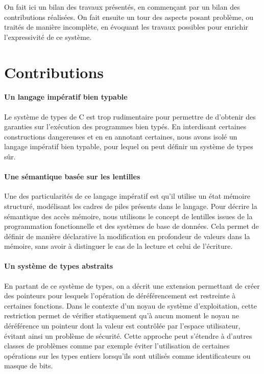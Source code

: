 On fait ici un bilan des travaux présentés, en commençant par un bilan des
contributions réalisées. On fait ensuite un tour des aspects posant problème, ou
traités de manière incomplète, en évoquant les travaux possibles pour enrichir
l'expressivité de ce système.


\section{Contributions}

\paragraph{Un langage impératif bien typable}

Le système de types de C est trop rudimentaire pour permettre de d'obtenir des
garanties sur l'exécution des programmes bien typés. En interdisant certaines
constructions dangereuses et en en annotant certaines, nous avons isolé un
langage impératif bien typable, pour lequel on peut définir un système de types
sûr.

\paragraph{Une sémantique basée sur les lentilles}

Une des particularités de ce langage impératif est qu'il utilise un état mémoire
structuré, modélisant les cadres de piles présents dans le langage. Pour décrire
la sémantique des accès mémoire, nous utilisons le concept de lentilles issues
de la programmation fonctionnelle et des systèmes de base de données. Cela
permet de définir de manière déclarative la modification en profondeur de
valeurs dans la mémoire, sans avoir à distinguer le cas de la lecture et celui
de l'écriture.


\paragraph{Un système de types abstraits}

En partant de ce système de types, on a décrit une extension permettant de créer
des pointeurs pour lesquels l'opération de déréférencement est restreinte à
certaines fonctions. Dans le contexte d'un noyau de système d'exploitation,
cette restriction permet de vérifier statiquement qu'à aucun moment le noyau ne
déréférence un pointeur dont la valeur est contrôlée par l'espace utilisateur,
évitant ainsi un problème de sécurité. Cette approche peut s'étendre à d'autres
classes de problèmes comme par exemple éviter l'utilisation de certaines
opérations sur les types entiers lorsqu'ils sont utilisés comme identificateurs
ou masque de bits.

